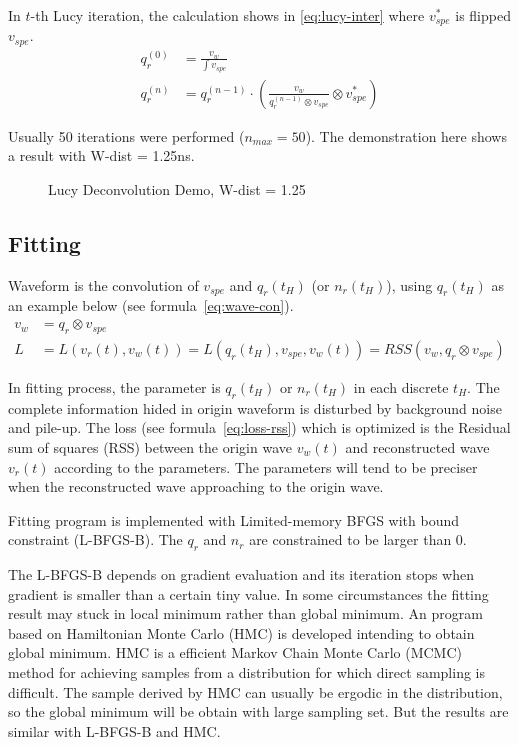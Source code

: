 In $t$-th Lucy iteration, the calculation shows in \eqref{eq:lucy-inter} where $v^{*}_{spe}$ is flipped $v_{spe}$. 
\begin{align}
    q_{r}^{(0)} &= \frac{v_{w}}{\int v_{spe}} \\
    q_{r}^{(n)} &= q_{r}^{(n-1)} \cdot \left(\frac{v_{w}}{q_{r}^{(n-1)} \otimes v_{spe}} \otimes v^{*}_{spe}\right) \label{eq:lucy-inter}
\end{align}

Usually 50 iterations were performed ($n_{max}=50$). The demonstration here shows a result with W-dist = 1.25ns. 

\begin{figure}[H]
    \centering
    \scalebox{0.4}{}
    \caption{Lucy Deconvolution Demo, W-dist = 1.25}
\end{figure}

\subsection{Fitting}
Waveform is the convolution of $v_{spe}$ and $q_{r}(t_{H})$ (or $n_{r}(t_{H})$), using $q_{r}(t_{H})$ as an example below (see formula~\eqref{eq:wave-con}). 
\begin{align}
    v_{w} &= q_{r} \otimes v_{spe} \label{eq:wave-con} \\
    L &= L(v_{r}(t), v_{w}(t)) = L(q_{r}(t_{H}), v_{spe}, v_{w}(t)) = RSS(v_{w}, q_{r} \otimes v_{spe}) \label{eq:loss-rss}
\end{align}

In fitting process, the parameter is $q_{r}(t_{H})$ or $n_{r}(t_{H})$ in each discrete $t_{H}$. The complete information hided in origin waveform is disturbed by background noise and pile-up. The loss (see formula~\ref{eq:loss-rss}) which is optimized is the Residual sum of squares (RSS) between the origin wave $v_{w}(t)$ and reconstructed wave $v_{r}(t)$ according to the parameters. The parameters will tend to be preciser when the reconstructed wave approaching to the origin wave. 

Fitting program is implemented with Limited-memory BFGS with bound constraint\cite{byrd_limited_1995} (L-BFGS-B). The $q_{r}$ and $n_{r}$ are constrained to be larger than 0. 

The L-BFGS-B depends on gradient evaluation and its iteration stops when gradient is smaller than a certain tiny value. In some circumstances the fitting result may stuck in local minimum rather than global minimum. An program based on Hamiltonian Monte Carlo (HMC) is developed intending to obtain global minimum. HMC is a efficient Markov Chain Monte Carlo (MCMC) method for achieving samples from a distribution for which direct sampling is difficult\cite{neal_mcmc_2012}. The sample derived by HMC can usually be ergodic in the distribution, so the global minimum will be obtain with large sampling set. But the results are similar with L-BFGS-B and HMC. 

